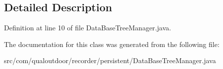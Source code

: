 \subsection{Detailed Description}


Definition at line 10 of file Data\-Base\-Tree\-Manager.\-java.



The documentation for this class was generated from the following file\-:\begin{DoxyCompactItemize}
\item 
src/com/qualoutdoor/recorder/persistent/Data\-Base\-Tree\-Manager.\-java\end{DoxyCompactItemize}
